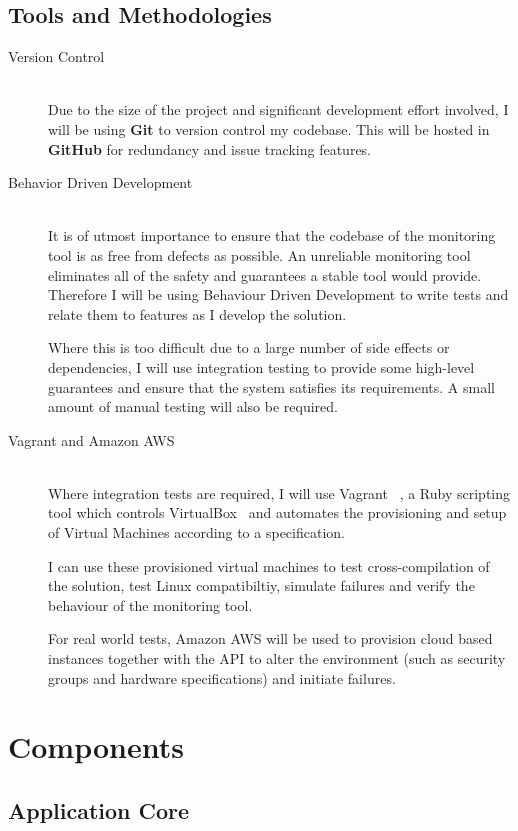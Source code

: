 \documentclass{cshonours}
\begin{document}
\subsection{Tools and Methodologies}
\begin{description}
  \item [Version Control]\hfill \\
    Due to the size of the project and significant development effort involved, I will be using \textbf{Git} to version control my codebase. This will be hosted in \textbf{GitHub} for redundancy and issue tracking features.
  \item [Behavior Driven Development]\hfill \\
    It is of utmost importance to ensure that the codebase of the monitoring tool is as free from defects as possible. An unreliable monitoring tool eliminates all of the safety and guarantees a stable tool would provide. Therefore I will be using Behaviour Driven Development to write tests and relate them to features as I develop the solution.

    Where this is too difficult due to a large number of side effects or dependencies, I will use integration testing to provide some high-level guarantees and ensure that the system satisfies its requirements. A small amount of manual testing will also be required.
  \item [Vagrant and Amazon AWS]\hfill \\
    Where integration tests are required, I will use Vagrant ~\cite{Vagrant}, a Ruby scripting tool which controls VirtualBox~\cite{VirtualBox} and automates the provisioning and setup of Virtual Machines according to a specification.

    I can use these provisioned virtual machines to test cross-compilation of the solution, test Linux compatibiltiy, simulate failures and verify the behaviour of the monitoring tool.
   
    For real world tests, Amazon AWS will be used to provision cloud based instances together with the API to alter the environment (such as security groups and hardware specifications) and initiate failures. 
\end{description}

\section{Components}
\subsection{Application Core}
\end{document}
